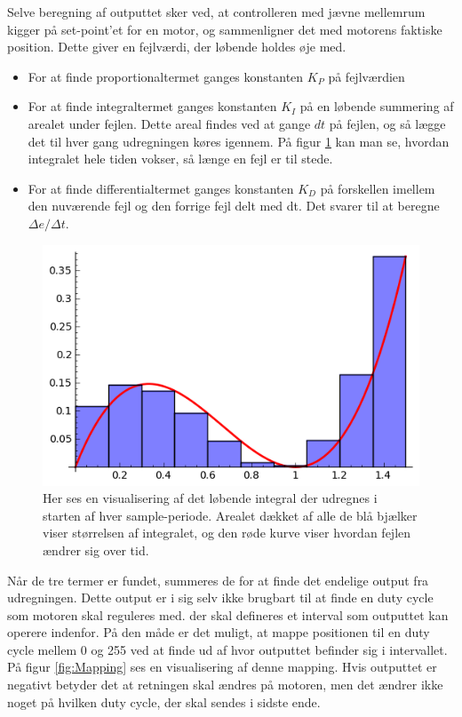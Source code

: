 Selve beregning af outputtet sker ved, at controlleren med jævne mellemrum kigger på set-point'et for en motor, og sammenligner det med motorens faktiske position. Dette giver en fejlværdi, der løbende holdes øje med. 
\begin{itemize}[noitemsep]
	\item For at finde proportionaltermet ganges konstanten $K_{P}$ på fejlværdien
	\item For at finde integraltermet ganges konstanten $K_{I}$ på en løbende summering af arealet under fejlen. Dette areal findes ved at gange $dt$ på fejlen, og så lægge det til hver gang udregningen køres igennem. På figur \ref{fig:Riemann} kan man se, hvordan integralet hele tiden vokser, så længe en fejl er til stede.
	\item For at finde differentialtermet ganges konstanten $K_{D}$ på forskellen imellem den nuværende fejl og den forrige fejl delt med dt. Det svarer til at beregne $\Delta e/\Delta t$.
\end{itemize}

\begin{figure}[ht]
	\begin{center}
	\includegraphics[scale=0.8]{Billeder/RiemannSum.png}
	\end{center}		
	\caption{Her ses en visualisering af det løbende integral der udregnes i starten af hver sample-periode. Arealet dækket af alle de blå bjælker viser størrelsen af integralet, og den røde kurve viser hvordan fejlen ændrer sig over tid.}
	\label{fig:Riemann}
\end{figure}

Når de tre termer er fundet, summeres de for at finde det endelige output fra udregningen. Dette output er i sig selv ikke brugbart til at finde en duty cycle som motoren skal reguleres med. der skal defineres et interval som outputtet kan operere indenfor. På den måde er det muligt, at mappe positionen til en duty cycle mellem 0 og 255 ved at finde ud af hvor outputtet befinder sig i intervallet. På figur \ref{fig:Mapping} ses en visualisering af denne mapping. Hvis outputtet er negativt betyder det at retningen skal ændres på motoren, men det ændrer ikke noget på hvilken duty cycle, der skal sendes i sidste ende.

